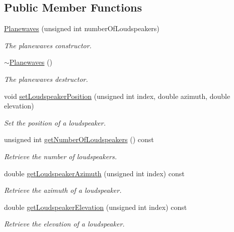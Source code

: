 \subsection*{Public Member Functions}
\begin{DoxyCompactItemize}
\item 
\hyperlink{class_hoa3_d_1_1_planewaves_ad190f41c56070493b4c55f4fcc9c6911}{Planewaves} (unsigned int number\-Of\-Loudspeakers)
\begin{DoxyCompactList}\small\item\em The planewaves constructor. \end{DoxyCompactList}\item 
\hyperlink{class_hoa3_d_1_1_planewaves_a51d3ba8bcdb8ad2e0c41e780f3c35d51}{$\sim$\-Planewaves} ()
\begin{DoxyCompactList}\small\item\em The planewaves destructor. \end{DoxyCompactList}\item 
void \hyperlink{class_hoa3_d_1_1_planewaves_ab39d630c1c191963cd35dd3b6a28ebc8}{set\-Loudspeaker\-Position} (unsigned int index, double azimuth, double elevation)
\begin{DoxyCompactList}\small\item\em Set the position of a loudspeaker. \end{DoxyCompactList}\item 
unsigned int \hyperlink{class_hoa3_d_1_1_planewaves_a467cdb1f079bb299225a9fac56a500e4}{get\-Number\-Of\-Loudspeakers} () const 
\begin{DoxyCompactList}\small\item\em Retrieve the number of loudspeakers. \end{DoxyCompactList}\item 
double \hyperlink{class_hoa3_d_1_1_planewaves_a8c0385dcf84e93ea035a91659122ce58}{get\-Loudspeaker\-Azimuth} (unsigned int index) const 
\begin{DoxyCompactList}\small\item\em Retrieve the azimuth of a loudspeaker. \end{DoxyCompactList}\item 
double \hyperlink{class_hoa3_d_1_1_planewaves_ae3b79c947e1923c5aad5067f7a2b29eb}{get\-Loudspeaker\-Elevation} (unsigned int index) const 
\begin{DoxyCompactList}\small\item\em Retrieve the elevation of a loudspeaker. \end{DoxyCompactList}\item 

\end{DoxyCompactItemize}
